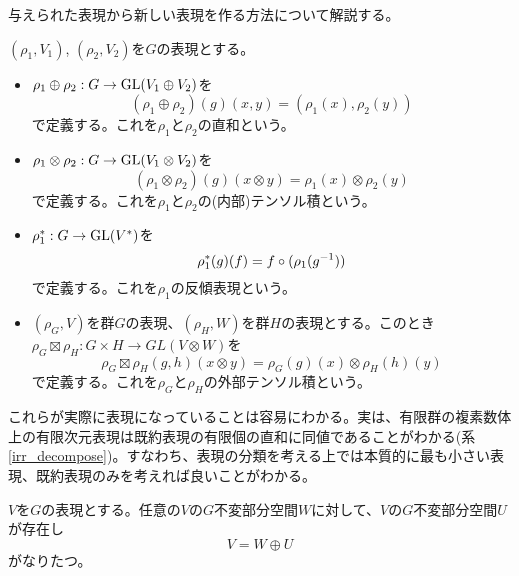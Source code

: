 \documentclass{ltjsreport}
\begin{document}
与えられた表現から新しい表現を作る方法について解説する。
\begin{defin}
  $(\rho_1,V_1)$, $(\rho_2,V_2)$を$G$の表現とする。
  \begin{itemize}
    \item $\rho_1\oplus\rho_2:G\rightarrow\text{GL}(V_1\oplus V_2)$を
    \[
    (\rho_1\oplus\rho_2)(g)(x,y)=(\rho_1(x),\rho_2(y))
    \]
    で定義する。これを$\rho_1$と$\rho_2$の直和という。

    \item $\rho_1\otimes\rho_2:G\rightarrow\text{GL}(V_1\otimes V_2)$を
    \[
    (\rho_1\otimes\rho_2)(g)(x\otimes y)=\rho_1(x)\otimes\rho_2(y)
    \]
    で定義する。これを$\rho_1$と$\rho_2$の(内部)テンソル積という。

    \item $\rho_1^*:G\rightarrow\text{GL}(V^*)$を
    \[
    \rho_1^*(g)(f)=f\circ (\rho_1(g^{-1}))
    \]
    で定義する。これを$\rho_1$の反傾表現という。

    \item $(\rho_G,V)$を群$G$の表現、$(\rho_H,W)$を群$H$の表現とする。このとき$\rho_G\boxtimes\rho_H:G\times H\rightarrow GL(V\otimes W)$を
    \[
      \rho_G\boxtimes\rho_H(g,h)(x\otimes y)=\rho_G(g)(x)\otimes\rho_H(h)(y)
    \]
    で定義する。これを$\rho_G$と$\rho_H$の外部テンソル積という。
  \end{itemize}
\end{defin}

  これらが実際に表現になっていることは容易にわかる。実は、有限群の複素数体上の有限次元表現は既約表現の有限個の直和に同値であることがわかる(系\ref{irr_decompose})。すなわち、表現の分類を考える上では本質的に最も小さい表現、既約表現のみを考えれば良いことがわかる。

  \begin{theo}[Maschkeの定理]\label{maschke}
    $V$を$G$の表現とする。任意の$V$の$G$不変部分空間$W$に対して、$V$の$G$不変部分空間$U$が存在し
    \[
    V= W\oplus U
    \]
    がなりたつ。
  \end{theo}
\end{document}
